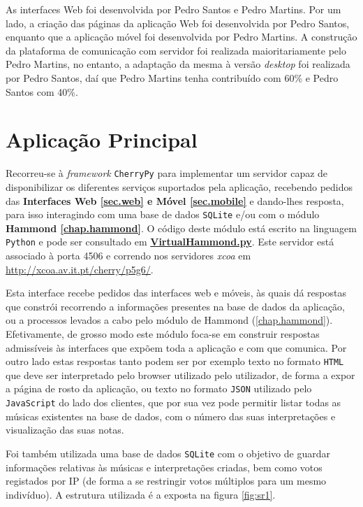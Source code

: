 \documentclass[a4paper,11pt,openright,oneside]{report}
\begin{document}
As interfaces Web foi desenvolvida por Pedro Santos e Pedro Martins. Por um lado, a criação das páginas da aplicação Web foi desenvolvida por Pedro Santos, enquanto que a aplicação móvel foi desenvolvida por Pedro Martins. A construção da plataforma de comunicação com servidor foi realizada maioritariamente pelo Pedro Martins, no entanto, a adaptação da mesma à versão \textit{desktop} foi realizada por Pedro Santos, daí que Pedro Martins tenha contribuído com 60\% e Pedro Santos com 40\%.


\chapter{Aplicação Principal}
\label{chap.mainapp}

Recorreu-se à \textit{framework} \verb|CherryPy| para implementar um servidor capaz de disponibilizar os diferentes serviços suportados pela aplicação, recebendo pedidos das \textbf{Interfaces Web \ref{sec.web} e Móvel \ref{sec.mobile}} e dando-lhes resposta, para isso interagindo com uma base de dados \verb|SQLite| e/ou com o módulo \textbf{Hammond \ref{chap.hammond}}. O código deste módulo está escrito na linguagem \verb|Python| e pode ser consultado em \href{../../MainApp/VirtualHammond.py}{\textbf{VirtualHammond.py}}. Este servidor está associado à porta 4506 e correndo nos servidores \textit{xcoa} em \url{http://xcoa.av.it.pt/cherry/p5g6/}.

Esta interface recebe pedidos das interfaces web e móveis, às quais dá respostas que constrói recorrendo a informações presentes na base de dados da aplicação, ou a processos levados a cabo pelo módulo de Hammond (\ref{chap.hammond}). Efetivamente, de grosso modo este módulo foca-se em construir respostas admissíveis às interfaces que expõem toda a aplicação e com que comunica. Por outro lado estas respostas tanto podem ser por exemplo texto no formato \verb|HTML| que deve ser interpretado pelo browser utilizado pelo utilizador, de forma a expor a página de rosto da aplicação, ou texto no formato \verb|JSON| utilizado pelo \verb|JavaScript| do lado dos clientes, que por sua vez pode permitir listar todas as músicas existentes na base de dados, com o número das suas interpretações e visualização das suas notas.

Foi também utilizada uma base de dados \verb|SQLite| com o objetivo de guardar informações relativas às músicas e interpretações criadas, bem como votos registados por IP (de forma a se restringir votos múltiplos para um mesmo indivíduo). A estrutura utilizada é a exposta na figura \ref{fig:sr1}.
\end{document}
